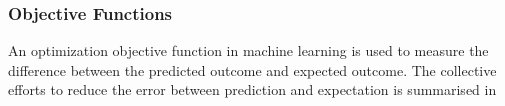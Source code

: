 \subsubsection{Objective Functions}
An optimization objective function in machine learning is used to measure the difference between the predicted outcome and expected outcome. The collective efforts to reduce the error between prediction and expectation is summarised in 